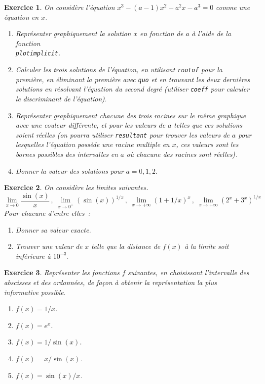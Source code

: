 \documentclass{article}
\newtheorem{exo}{Exercice}[section]
\begin{document}
\begin{exo}{\rm
On consid\`ere l'\'equation $x^3-(a-1)x^2+a^2x-a^3=0$ comme une
\'equation en $x$. 
\begin{enumerate}
\item
Repr\'esenter graphiquement la solution $x$ en fonction de $a$ \`a l'aide
de la fonction\\ \verb|plotimplicit|.
\item
Calculer les trois solutions de l'\'equation, en utilisant \verb|rootof|
pour la premi\`ere, en \'eliminant la premi\`ere avec \verb|quo| et en
trouvant les deux derni\`eres solutions en r\'esolvant l'\'equation
du second degr\'e (utiliser \verb|coeff| pour calculer le discriminant
de l'\'equation).
\item
Repr\'esenter graphiquement chacune des
trois racines sur le m\^eme graphique avec une couleur
diff\'erente, et pour les valeurs de $a$
telles que ces solutions soient r\'eelles (on pourra utiliser
\verb|resultant| pour trouver les valeurs de $a$ pour lesquelles
l'\'equation poss\`ede une racine multiple en $x$, ces valeurs
sont les bornes possibles des intervalles en $a$ o\`u chacune des
racines sont r\'eelles).
\item
Donner la valeur des
solutions pour $a=0,1,2$.
\end{enumerate} 
}\end{exo}
\begin{exo}{\rm
On consid\`ere les limites suivantes.
$$
\lim_{x\rightarrow 0} \frac{\sin(x)}{x}
\,,\;
\lim_{x\rightarrow 0^+} (\sin(x))^{1/x}
\,,\;
\lim_{x\rightarrow +\infty} (1+1/x)^{x}
\,,\;
\lim_{x\rightarrow +\infty} (2^x+3^x)^{1/x}
$$
Pour chacune d'entre elles~:
\begin{enumerate}
\item
Donner sa valeur exacte.
\item
Trouver une valeur de $x$ telle que la distance de $f(x)$ \`a la
limite soit inf\'erieure \`a $10^{-3}$.
\end{enumerate} 
}\end{exo}
\begin{exo}{\rm
Repr\'esenter les fonctions $f$ suivantes, en choisissant l'intervalle
des abscisses et des ordonn\'ees, de fa\c{c}on \`a obtenir 
la repr\'esentation la plus informative possible. 
\begin{enumerate}
\item
$f(x)=1/x$.
\item
$f(x)=e^x$.
\item
$f(x)=1/\sin(x)$.
\item
$f(x)=x/\sin(x)$.
\item
$f(x)=\sin(x)/x$.
\end{enumerate} 
}\end{exo}
\end{document}
